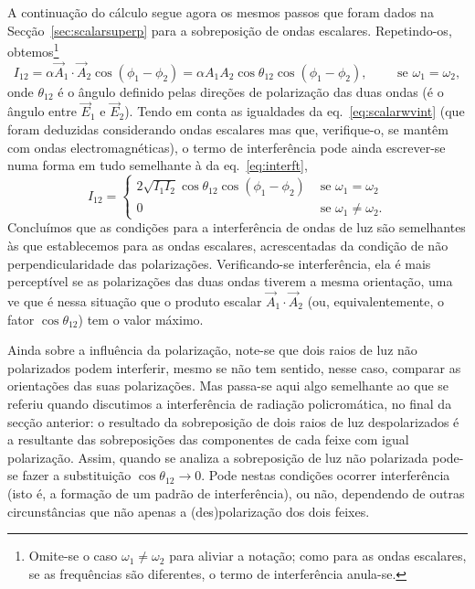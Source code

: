 A continuação do cálculo segue agora os mesmos passos que foram dados na
Secção~\ref{sec:scalarsuperp} para a sobreposição de ondas escalares.
Repetindo-os, obtemos\footnote{Omite-se o caso $\omega_1\neq\omega_2$ para aliviar a
notação; como para as ondas escalares, se as frequências são diferentes, o termo
de interferência anula-se.}
\begin{equation}
  I_{12}=\alpha \vec A_1\cdot\vec A_2\cos(\phi_1-\phi_2)=\alpha
  A_1A_2\cos\theta_{12}\cos(\phi_1-\phi_2),\qquad\text{ se }\omega_1=\omega_2,
\end{equation}
onde $\theta_{12}$ é o ângulo definido pelas direções de polarização das duas
ondas (é o ângulo entre $\vec E_1$ e $\vec E_2$). Tendo em conta as igualdades
da eq.~\eqref{eq:scalarwvint} (que foram deduzidas considerando ondas escalares
mas que, verifique-o, se mantêm com ondas electromagnéticas), o termo de
interferência pode ainda escrever-se numa forma em tudo semelhante à da
eq.~\eqref{eq:interft},
\begin{equation}\label{eq:interfvec}
  I_{12}=
  \begin{cases}
    2\sqrt{I_1I_2}\cos\theta_{12}\cos(\phi_1-\phi_2) & \text{ se
    }\omega_1=\omega_2\\
    0& \text{ se } \omega_1\neq\omega_2.
  \end{cases}
\end{equation}
Concluímos que as condições para a interferência de ondas de luz são semelhantes
às que establecemos para as ondas escalares, acrescentadas da condição de não
perpendicularidade das polarizações. Verificando-se interferência, ela é mais
perceptível se as polarizações das duas ondas tiverem a mesma orientação, uma ve
que é nessa situação que o produto escalar $\vec A_1\cdot\vec A_2$ (ou,
equivalentemente, o fator $\cos\theta_{12}$) tem o valor máximo. 

Ainda sobre a influência da polarização, note-se que dois raios de luz
não polarizados podem interferir, mesmo se não tem sentido, nesse caso, comparar
as orientações das suas polarizações. Mas passa-se aqui algo semelhante ao que
se referiu quando discutimos a interferência de radiação policromática, no final
da secção anterior: o resultado da sobreposição de dois raios de luz
despolarizados é a resultante das sobreposições das componentes de cada feixe
com igual polarização. Assim, quando se analiza a sobreposição de luz não
polarizada pode-se fazer a substituição $\cos\theta_{12}\rightarrow 0$. Pode
nestas condições ocorrer interferência (isto é, a
formação de um padrão de interferência), ou não, dependendo de outras
circunstâncias que não apenas a (des)polarização dos dois feixes.

